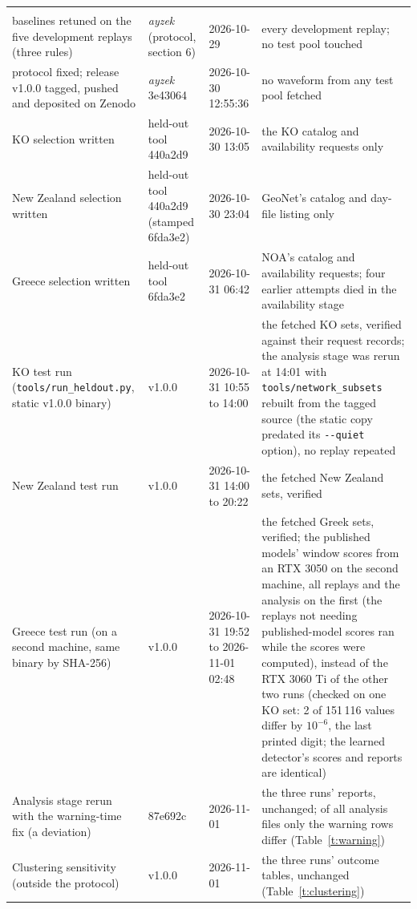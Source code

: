 \documentclass[11pt,a4paper]{article}
\newcommand{\tool}[1]{\nolinkurl{#1}}
\begin{document}
\begin{table}[htbp]
\begin{tabular}{@{}L{3.6cm}L{2.9cm}L{2.3cm}L{5.6cm}@{}}
    \addlinespace
     \\
    baselines retuned on the five development replays (three rules) &
    \emph{ayzek} (protocol, section 6) & 2026-10-29 &
    every development replay; no test pool touched \\
    protocol fixed; release v1.0.0 tagged, pushed and deposited on Zenodo &
    \emph{ayzek} 3e43064 & 2026-10-30 12:55:36 &
    no waveform from any test pool fetched \\
    KO selection written &
    held-out tool 440a2d9 & 2026-10-30 13:05 &
    the KO catalog and availability requests only \\
    New Zealand selection written &
    held-out tool 440a2d9 (stamped 6fda3e2) & 2026-10-30 23:04 &
    GeoNet's catalog and day-file listing only \\
    Greece selection written &
    held-out tool 6fda3e2 & 2026-10-31 06:42 &
    NOA's catalog and availability requests; four earlier attempts died in the availability stage \\
    KO test run (\tool{tools/run\_heldout.py}, static v1.0.0 binary) &
    v1.0.0 & 2026-10-31 10:55 to 14:00 &
    the fetched KO sets, verified against their request records; the analysis
    stage was rerun at 14:01 with \tool{tools/network\_subsets} rebuilt from the
    tagged source (the static copy predated its \tool{--quiet} option), no replay
    repeated \\
    New Zealand test run &
    v1.0.0 & 2026-10-31 14:00 to 20:22 &
    the fetched New Zealand sets, verified \\
    Greece test run (on a second machine, same binary by SHA-256) &
    v1.0.0 & 2026-10-31 19:52 to 2026-11-01 02:48 &
    the fetched Greek sets, verified; the published models' window scores from an
    RTX 3050 on the second machine, all replays and the analysis on the first (the
    replays not needing published-model scores ran while the scores were computed),
    instead of the RTX 3060 Ti of the other two runs (checked on one KO set:
    2 of 151\,116 values differ by $10^{-6}$, the last printed digit; the learned
    detector's scores and reports are identical) \\
    Analysis stage rerun with the warning-time fix (a deviation) &
    87e692c & 2026-11-01 &
    the three runs' reports, unchanged; of all analysis files only the warning rows
    differ (Table~\ref{t:warning}) \\
    Clustering sensitivity (outside the protocol) &
    v1.0.0 & 2026-11-01 &
    the three runs' outcome tables, unchanged (Table~\ref{t:clustering}) \\
    \bottomrule
  \end{tabular}
\end{table}
\end{document}
